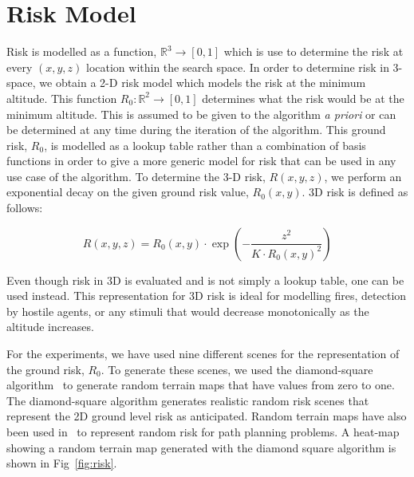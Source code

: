 \documentclass{article}
\begin{document}
\section{Risk Model}

Risk is modelled as a function, $\mathbb{R}^3 \rightarrow [0, 1]$ which is use
to determine the risk at every $(x, y, z)$ location within the search space. In
order to determine risk in 3-space, we obtain a 2-D risk model which models the
risk at the minimum altitude. This function $R_0 : \mathbb{R}^2 \rightarrow [0,
1]$ determines what the risk would be at the minimum altitude. This is assumed
to be given to the algorithm \emph{a priori} or can be determined at any time
during the iteration of the algorithm. This ground risk, $R_0$, is modelled as
a lookup table rather than a combination of basis functions in order to give a
more generic model for risk that can be used in any use case of the algorithm.
To determine the 3-D risk, $R(x, y, z)$, we perform an exponential decay on the
given ground risk value, $R_0(x, y)$. 3D risk is defined as follows:

$$ R(x, y, z) = R_0(x, y) \cdot \exp{\left(-\frac{z^2}{K \cdot R_0(x,
y)^2}\right)}$$

Even though risk in 3D is evaluated and is not simply a lookup table, one can
be used instead. This representation for 3D risk is ideal for modelling fires,
detection by hostile agents, or any stimuli that would decrease monotonically
as the altitude increases.

For the experiments, we have used nine different scenes for the representation
of the ground risk, $R_0$. To generate these scenes, we used the diamond-square
algorithm~\cite{DBLP:journals/cacm/FournierFC82} to generate random terrain
maps that have values from zero to one.  The diamond-square algorithm generates
realistic random risk scenes that represent the 2D ground level risk as
anticipated. Random terrain maps have also been used
in~\cite{DBLP:conf/icra/MurphyN11} to represent random risk for path planning
problems. A heat-map showing a random terrain map generated with the diamond
square algorithm is shown in Fig~\ref{fig:risk}.
\end{document}

